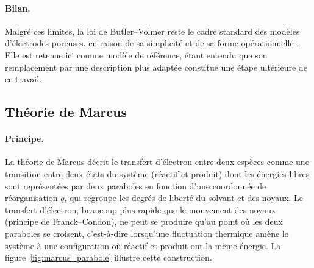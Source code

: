 \paragraph{Bilan.}
Malgré ces limites, la loi de Butler--Volmer reste le cadre standard des
modèles d'électrodes poreuses, en raison de sa simplicité et de sa forme
opérationnelle \cite{fullerSimulationOptimizationDual1994,
zhangUnderstandingRolePorous2020}. Elle est retenue ici comme modèle de
référence, étant entendu que son remplacement par une description plus
adaptée constitue une étape ultérieure de ce travail.


\subsection*{Théorie de Marcus}

\paragraph{Principe.}
La théorie de Marcus décrit le transfert d'électron entre deux espèces comme
une transition entre deux états du système (réactif et produit) dont les
énergies libres sont représentées par deux paraboles en fonction d'une
coordonnée de réorganisation $q$, qui regroupe les degrés de liberté du
solvant et des noyaux. Le transfert d'électron, beaucoup plus rapide que le
mouvement des noyaux (principe de Franck--Condon), ne peut se produire qu'au
point où les deux paraboles se croisent, c'est-à-dire lorsqu'une fluctuation
thermique amène le système à une configuration où réactif et produit ont la
même énergie. La figure~\ref{fig:marcus_parabole} illustre cette
construction.

